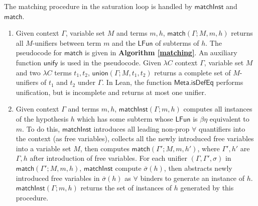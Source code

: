 The matching procedure in the saturation loop is handled by $\mathsf{matchInst}$ and $\mathsf{match}$.
\begin{enumerate}
  \item Given context $\Gamma$, variable set $M$ and terms $m, h$,
    $\mathsf{match}(\Gamma; M, m, h)$ returns all $M$-unifiers between term $m$ and the $\mathsf{LFun}$ of subterms of $h$.
    The pseudocode for $\mathsf{match}$ is given in \textbf{Algorithm \ref{matching}}. An auxiliary function
    $\mathsf{unify}$ is used in the pseudocode. Given $\lambda C$ context $\Gamma$, variable set $M$
    and two $\lambda C$ terms $t_1, t_2$, $\mathsf{union}(\Gamma; M, t_1, t_2)$ returns a complete set of
    $M$-unifiers of $t_1$ and $t_2$ under $\Gamma$. In Lean, the function $\mathsf{Meta.isDefEq}$ performs
    unification, but is incomplete and returns at most one unifier.
  \item Given context $\Gamma$ and terms $m, h$,
    $\mathsf{matchInst}(\Gamma; m, h)$ computes all instances of the hypothesis $h$ which has some subterm whose
    $\mathsf{LFun}$ is $\beta\eta$ equivalent to $m$. To do this, $\mathsf{matchInst}$ introduces all leading non-prop $\forall$
    quantifiers into the context (as free variables), collects all the newly introduced free variables into a variable set $M$,
    then computes $\mathsf{match}(\Gamma'; M, m, h')$, where $\Gamma', h'$ are $\Gamma, h$ after introduction of free variables.
    For each unifier $(\Gamma, \Gamma', \sigma)$ in $\mathsf{match}(\Gamma'; M, m, h)$, $\mathsf{matchInst}$ compute $\overline{\sigma}(h)$,
    then abstracts newly introduced free variables in $\overline{\sigma}(h)$ as $\forall$ binders to generate an instance of $h$.
    $\mathsf{matchInst}(\Gamma; m, h)$ returns the set of instances of $h$ generated by this procedure. 
\end{enumerate}

